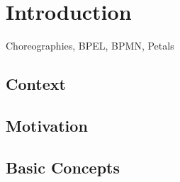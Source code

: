 \section{Introduction}

Choreographies, BPEL, BPMN, Petals

\subsection{Context}

\subsection{Motivation}

\subsection{Basic Concepts}